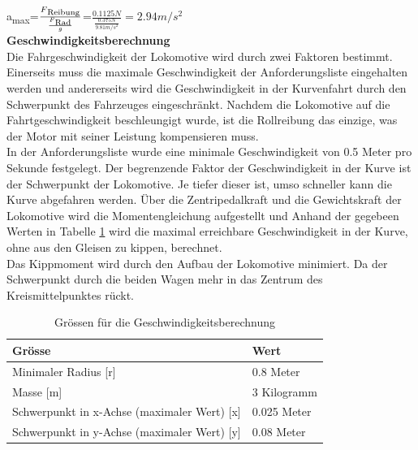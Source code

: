 \documentclass[../../main.tex]{subfiles}
\begin{document}
    a\textsubscript{max}=\(\frac{F\textsubscript{Reibung}}{\frac{F\textsubscript{Rad}}{g}}\)=\(\frac{0.1125N}{\frac{0.375N}{9.81m/s^2}}=2.94m/s^2\)\\

    \label{GeschwindigkeitsberechnungFahrwerk}
    \textbf{Geschwindigkeitsberechnung}\\
    Die Fahrgeschwindigkeit der Lokomotive wird durch zwei Faktoren bestimmt. Einerseits muss die maximale Geschwindigkeit der Anforderungsliste eingehalten werden und andererseits wird die Geschwindigkeit in der Kurvenfahrt durch den Schwerpunkt des Fahrzeuges eingeschränkt. Nachdem die Lokomotive auf die Fahrtgeschwindigkeit beschleungigt wurde, ist die Rollreibung das einzige, was der Motor mit seiner Leistung kompensieren muss.\\

    In der Anforderungsliste wurde eine minimale Geschwindigkeit von 0.5 Meter pro Sekunde festgelegt. Der begrenzende Faktor der Geschwindigkeit in der Kurve ist der Schwerpunkt der Lokomotive. Je tiefer dieser ist, umso schneller kann die Kurve abgefahren werden. Über die Zentripedalkraft und die Gewichtskraft der Lokomotive wird die Momentengleichung aufgestellt und Anhand der gegebeen Werten in Tabelle \ref{tab:geschwindigkeitsberechnung} wird die maximal erreichbare Geschwindigkeit in der Kurve, ohne aus den Gleisen zu kippen, berechnet.\\

    Das Kippmoment wird durch den Aufbau der Lokomotive minimiert. Da der Schwerpunkt durch die beiden Wagen mehr in das Zentrum des Kreismittelpunktes rückt.\\

    \begin{table}[H] \centering
        \begin{tabular}{|l|l|}
        \hline
        \textbf{Grösse} & \textbf{Wert}\\
        \hline
        Minimaler Radius  [r]                               & 0.8 Meter\\
         \hline
        Masse [m]                                           & 3 Kilogramm\\
        \hline
        Schwerpunkt in x-Achse (maximaler Wert) [x]         & 0.025 Meter\\
        \hline
        Schwerpunkt in y-Achse (maximaler Wert) [y]         & 0.08 Meter\\
        \hline
        \end{tabular}

        \caption{Grössen für die Geschwindigkeitsberechnung}
        \label{tab:geschwindigkeitsberechnung}
        \end{table}
\end{document}
